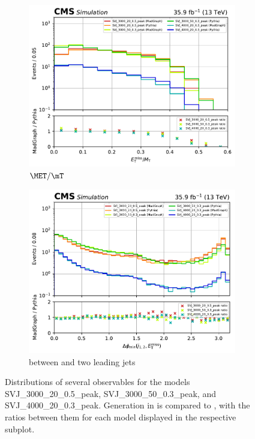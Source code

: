 \begin{figure}[htbp]
    \begin{subfigure}[b]{0.45\textwidth}
        \includegraphics[width=\textwidth]{figures/madgraph_pythia_comparisons/with_ratios/part2/met_over_mt.pdf}
        \caption{$\MET/\mT$}
    \end{subfigure}
    \hfill
    \begin{subfigure}[b]{0.45\textwidth}
        \includegraphics[width=\textwidth]{figures/madgraph_pythia_comparisons/with_ratios/part2/min_dphi.pdf}
        \caption{\mindphi between \MET and two leading \glspl{jet}}
    \end{subfigure}
    \caption[Distributions of several observables for the models SVJ\_3000\_20\_0.5\_peak, SVJ\_3000\_50\_0.3\_peak, and SVJ\_4000\_20\_0.3\_peak]{Distributions of several observables for the models SVJ\_3000\_20\_0.5\_peak, SVJ\_3000\_50\_0.3\_peak, and SVJ\_4000\_20\_0.3\_peak. Generation in \MGvATNLO is compared to \PYTHIAEIGHT, with the ratios between them for each model displayed in the respective subplot.}
    \label{fig:svj_mg_pythia_comparison_set2}
\end{figure}
